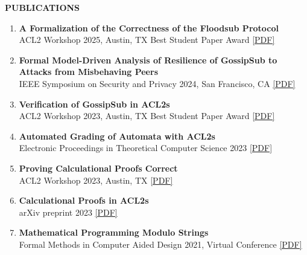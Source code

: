 \documentclass[11pt,letterpaper]{article}
\newcommand{\cvsection}[1]{
    \vspace{0.6em}
    {\color{darkblue}\textbf{\Large #1}}
    \vspace{0.15em}
    \textcolor{lightblue}{\hrulefill}
    \vspace{0.4em}
}
\begin{document}
\cvsection{PUBLICATIONS}
\begin{enumerate}
    \item \textbf{A Formalization of the Correctness of the Floodsub Protocol} \\
          ACL2 Workshop 2025, Austin, TX \textcolor{mediumgray}{\textbullet} Best Student Paper Award \textcolor{mediumgray}{\textbullet} \href{https://arxiv.org/abs/2507.19013}{[PDF]}

    \item \textbf{Formal Model-Driven Analysis of Resilience of GossipSub to Attacks from Misbehaving Peers} \\
          IEEE Symposium on Security and Privacy 2024, San Francisco, CA \textcolor{mediumgray}{\textbullet} \href{https://arxiv.org/abs/2212.05197}{[PDF]}

    \item \textbf{Verification of GossipSub in ACL2s} \\
          ACL2 Workshop 2023, Austin, TX \textcolor{mediumgray}{\textbullet} Best Student Paper Award \textcolor{mediumgray}{\textbullet} \href{https://arxiv.org/abs/2311.08859}{[PDF]}

    \item \textbf{Automated Grading of Automata with ACL2s} \\
          Electronic Proceedings in Theoretical Computer Science 2023 \textcolor{mediumgray}{\textbullet} \href{https://arxiv.org/abs/2303.05867}{[PDF]}

    \item \textbf{Proving Calculational Proofs Correct} \\
          ACL2 Workshop 2023, Austin, TX \textcolor{mediumgray}{\textbullet} \href{https://arxiv.org/abs/2311.08860}{[PDF]}

    \item \textbf{Calculational Proofs in ACL2s} \\
          arXiv preprint 2023 \textcolor{mediumgray}{\textbullet} \href{https://arxiv.org/abs/2307.12224}{[PDF]}

    \item \textbf{Mathematical Programming Modulo Strings} \\
          Formal Methods in Computer Aided Design 2021, Virtual Conference \textcolor{mediumgray}{\textbullet} \href{https://ieeexplore.ieee.org/document/9617664}{[PDF]}
\end{enumerate}
\end{document}
